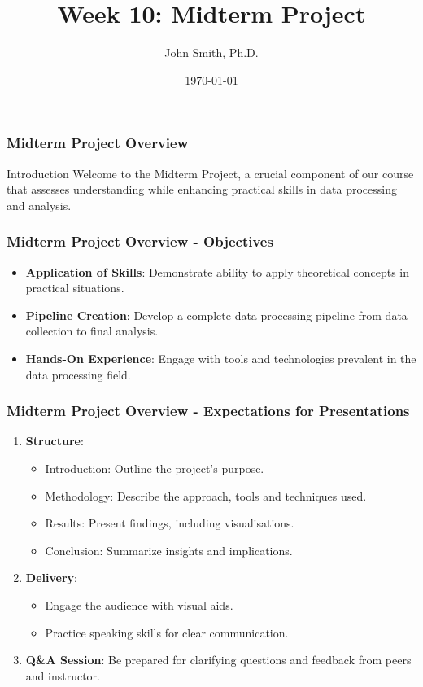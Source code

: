 \documentclass[aspectratio=169]{beamer}
\title[Midterm Project]{Week 10: Midterm Project}
\author[J. Smith]{John Smith, Ph.D.}
\institute[University Name]{
  Department of Computer Science\\
  University Name\\
  \vspace{0.3cm}
  Email: email@university.edu\\
  Website: www.university.edu
}
\date{\today}
\begin{document}
\frame{\titlepage}

\begin{frame}[fragile]
    \frametitle{Midterm Project Overview}
    \begin{block}{Introduction}
        Welcome to the Midterm Project, a crucial component of our course that assesses understanding while enhancing practical skills in data processing and analysis.
    \end{block}
\end{frame}

\begin{frame}[fragile]
    \frametitle{Midterm Project Overview - Objectives}
    \begin{itemize}
        \item \textbf{Application of Skills}: Demonstrate ability to apply theoretical concepts in practical situations.
        \item \textbf{Pipeline Creation}: Develop a complete data processing pipeline from data collection to final analysis.
        \item \textbf{Hands-On Experience}: Engage with tools and technologies prevalent in the data processing field.
    \end{itemize}
\end{frame}

\begin{frame}[fragile]
    \frametitle{Midterm Project Overview - Expectations for Presentations}
    \begin{enumerate}
        \item \textbf{Structure}:
            \begin{itemize}
                \item Introduction: Outline the project’s purpose.
                \item Methodology: Describe the approach, tools and techniques used.
                \item Results: Present findings, including visualisations.
                \item Conclusion: Summarize insights and implications.
            \end{itemize}
        \item \textbf{Delivery}:
            \begin{itemize}
                \item Engage the audience with visual aids.
                \item Practice speaking skills for clear communication.
            \end{itemize}
        \item \textbf{Q\&A Session}: Be prepared for clarifying questions and feedback from peers and instructor.
    \end{enumerate}
\end{frame}
\end{document}
